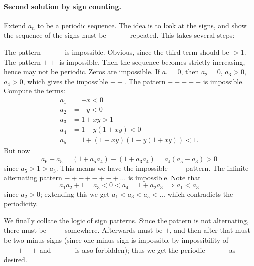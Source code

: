 \paragraph{Second solution by sign counting.}
Extend $a_n$ to be a periodic sequence.
The idea is to look at the signs, and show the sequence
of the signs must be $--+$ repeated.
This takes several steps:
\begin{itemize}
  \ii The pattern $---$ is impossible. Obvious, since the third term should be $ > 1$.
  \ii The pattern $++$ is impossible. Then the sequence becomes strictly increasing,
  hence may not be periodic.
  \ii Zeros are impossible. If $a_1 = 0$, then $a_2 = 0$, $a_3 > 0$, $a_4 > 0$,
  which gives the impossible $++$.
  \ii The pattern $--+-+$ is impossible.
  Compute the terms:
  \begin{align*}
    a_1 &= -x < 0 \\
    a_2 &= -y < 0 \\
    a_3 &= 1 + xy > 1 \\
    a_4 &= 1 - y(1+xy) < 0 \\
    a_5 &= 1 + (1+xy)(1-y(1+xy)) < 1.
  \end{align*}
  But now
  \[ a_6 - a_5 = (1 + a_5 a_4) - (1 + a_3 a_4)
    = a_4 (a_5 - a_3) > 0 \]
  since $a_5 > 1 > a_3$.
  This means we have the impossible $++$ pattern.
  \ii The infinite alternating pattern $-+-+-+-+\dots$ is impossible.
  Note that
  \[ a_1 a_2 + 1 = a_3 < 0 < a_4 = 1 + a_2 a_3 \implies a_1 < a_3 \]
  since $a_2 > 0$;
  extending this we get $a_1 < a_3 < a_5 < \dots$
  which contradicts the periodicity.
\end{itemize}
We finally collate the logic of sign patterns.
Since the pattern is not alternating, there must be $--$ somewhere.
Afterwards must be $+$, and then after that must be two minus signs
(since one minus sign is impossible by impossibility of $--+-+$
and $---$ is also forbidden);
thus we get the periodic $--+$ as desired.
\pagebreak